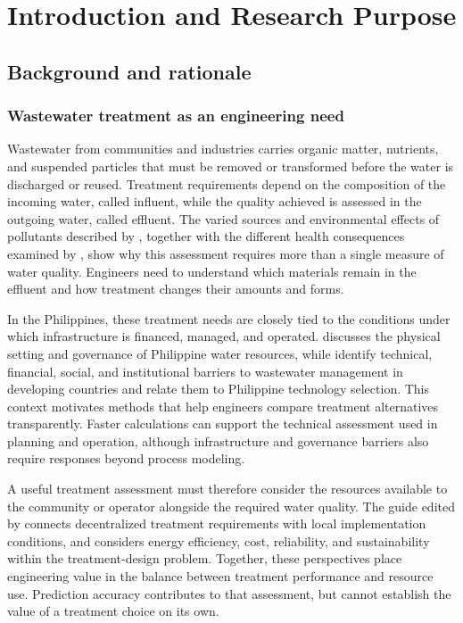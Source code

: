 \chapter{Introduction and Research Purpose}
\label{ch:introduction}

\section{Background and rationale}

\subsection{Wastewater treatment as an engineering need}

Wastewater from communities and industries carries organic matter, nutrients, and suspended particles that must be removed or transformed before the water is discharged or reused. Treatment requirements depend on the composition of the incoming water, called influent, while the quality achieved is assessed in the outgoing water, called effluent. The varied sources and environmental effects of pollutants described by \citet{Madhav2019}, together with the different health consequences examined by \citet{Lin2022}, show why this assessment requires more than a single measure of water quality. Engineers need to understand which materials remain in the effluent and how treatment changes their amounts and forms.

In the Philippines, these treatment needs are closely tied to the conditions under which infrastructure is financed, managed, and operated. \citet{Tabios2020} discusses the physical setting and governance of Philippine water resources, while \citet{DamalerioBarriers2022} identify technical, financial, social, and institutional barriers to wastewater management in developing countries and relate them to Philippine technology selection. This context motivates methods that help engineers compare treatment alternatives transparently. Faster calculations can support the technical assessment used in planning and operation, although infrastructure and governance barriers also require responses beyond process modeling.

A useful treatment assessment must therefore consider the resources available to the community or operator alongside the required water quality. The guide edited by \citet{Ulrich2009} connects decentralized treatment requirements with local implementation conditions, and \citet{Jafarinejad2020} considers energy efficiency, cost, reliability, and sustainability within the treatment-design problem. Together, these perspectives place engineering value in the balance between treatment performance and resource use. Prediction accuracy contributes to that assessment, but cannot establish the value of a treatment choice on its own.

